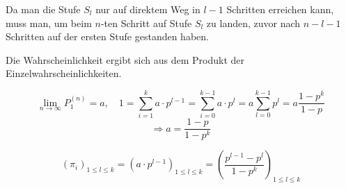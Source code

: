 \begin{flushenum}
\item
  Da man die Stufe $S_{l}$ nur auf direktem Weg in $l - 1$ Schritten erreichen
  kann, muss man, um beim $n$-ten Schritt auf Stufe $S_{l}$ zu landen, zuvor
  nach $n - l - 1$ Schritten auf der ersten Stufe gestanden haben.

  Die Wahrscheinlichkeit ergibt sich aus dem Produkt der
  Einzelwahrscheinlichkeiten.

  \item
   \[ \lim_{n\rightarrow\infty} P_{1}^{(n)} = a, \quad
      1 = \sum_{i=1}^{k} a \cdot p^{l-1} = \sum_{i=0}^{k-1} a \cdot p^{l} = a
   \sum_{l=0}^{k-1} p^{l} = a \frac{1-p^{k}}{1-p} \]
  \[ \Rightarrow a = \frac{1-p}{1-p^{k}} \]

  \[ (\pi_{i})_{1\leq l\leq k} = (a\cdot p^{l-1})_{1\leq l\leq k} 
     = (\frac{p^{l-1} - p^{l}}{1-p^{k}})_{1\leq l\leq k} \]
\end{flushenum}
